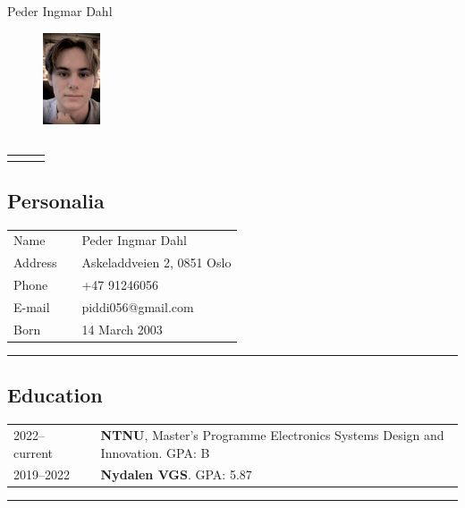 \documentclass[10pt]{article}
\newlength{\cw}
\newlength{\cwl}
\begin{document}
\begin{center}
\Large{Peder Ingmar Dahl}
\end{center}


\begin{figure}
  \begin{center}
    \includegraphics[width=0.15\textwidth]{Vedlegg/IMG_1433_mod.jpg}
  \end{center}
\end{figure}

\subsection*{}
\begin{tabular}{p{\cw} @{ }l p{\cwl}}
 & & \\ 
\end{tabular}
\vspace{0.2cm}

\subsection*{Personalia}
\begin{tabular}{p{\cw} @{:}l p{\cwl}}
Name & & Peder Ingmar Dahl \\
Address & & Askeladdveien 2, 0851 Oslo\\
Phone & & +47 91246056\\ 
E-mail & & piddi056@gmail.com \\
Born & & 14 March 2003 
\end{tabular}
\vspace{0.1cm}
\hrule
\vspace{0.1cm}

\subsection*{Education}
\begin{tabular}{p{\cw} @{:}l p{\cwl}}
  2022--current & & \textbf{NTNU}, Master's Programme Electronics Systems Design and Innovation. GPA: B \\
  2019--2022 & & \textbf{Nydalen VGS}. GPA: 5.87 \\ 
\end{tabular}
\vspace{0.1cm}
\hrule
\vspace{0.1cm}
\end{document}
